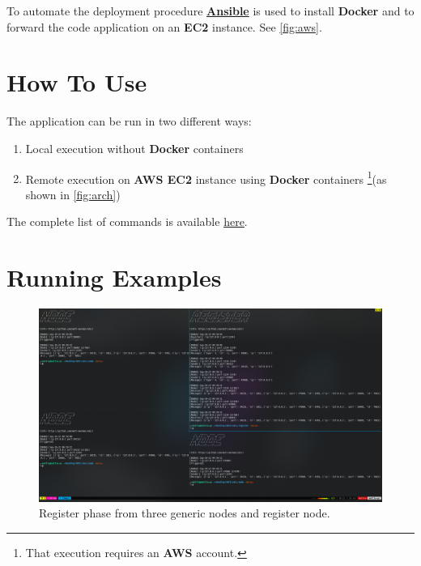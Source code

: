 \documentclass[conference]{IEEEtran}
\begin{document}
To automate the deployment procedure \href{https://www.ansible.com/}{\textbf{Ansible}} is used to install \textbf{Docker} and to forward the code application on an \textbf{EC2} instance. See \ref{fig:aws}.

\section{How To Use}\label{how}

The application can be run in two different ways:

\begin{enumerate}
    \item Local execution without \textbf{Docker} containers
    \item Remote execution on \textbf{AWS EC2} instance using \textbf{Docker} containers \footnote{That execution requires an \textbf{AWS} account.}(as shown in \ref{fig:arch})
\end{enumerate}

The complete list of commands is available \href{https://github.com/matt-merman/SDCC#running}{here}.

\section{Running Examples}

\begin{figure}[htb]\label{fig:register}
\includegraphics[width=\linewidth]{figure/register_terminal.png}
\caption{Register phase from three generic nodes and register node.}
\end{figure}
\end{document}
